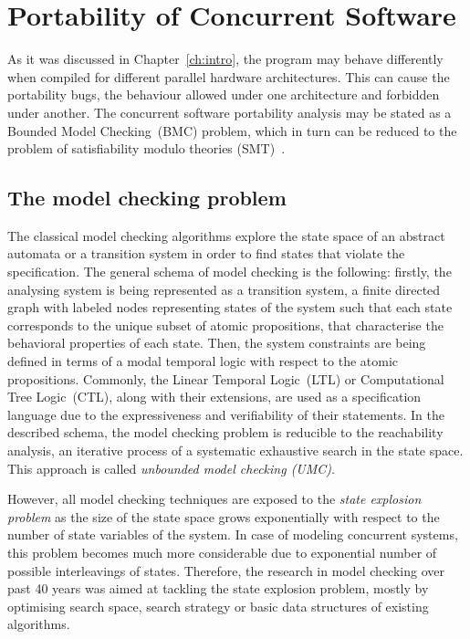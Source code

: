 \chapter{Portability of Concurrent Software}
\label{ch:port}

As it was discussed in Chapter~\ref{ch:intro}, the program may behave differently when compiled for different parallel hardware architectures. This can cause the portability bugs, the behaviour allowed under one architecture and forbidden under another. 
The concurrent software portability analysis may be stated as a Bounded Model Checking~(BMC) problem, which in turn can be reduced to the problem of satisfiability modulo theories (SMT)~\cite{Porthos17}.

\section{The model checking problem}
\label{ch:port:mc}

The classical model checking algorithms explore the state space of an abstract automata or a transition system in order to find states that violate the specification. The general schema of model checking is the following: firstly, the analysing system is being represented as a transition system, a finite directed graph with labeled nodes representing states of the system such that each state corresponds to the unique subset of atomic propositions, that characterise the behavioral properties of each state. 
Then, the system constraints are being defined in terms of a modal temporal logic with respect to the atomic propositions. Commonly, the Linear Temporal Logic~(LTL) or Computational Tree Logic~(CTL), along with their extensions, are used as a specification language due to the expressiveness and verifiability of their statements. 
In the described schema, the model checking problem is reducible to the reachability analysis, an iterative process of a systematic exhaustive search in the state space. This approach is called \textit{unbounded model checking (UMC)}.

However, all model checking techniques are exposed to the \textit{state explosion problem} as the size of the state space grows exponentially with respect to the number of state variables of the system. In case of modeling concurrent systems, this problem becomes much more considerable due to exponential number of possible interleavings of states.
Therefore, the research in model checking over past 40 years was aimed at tackling the state explosion problem, mostly by optimising search space, search strategy or basic data structures of existing algorithms.

